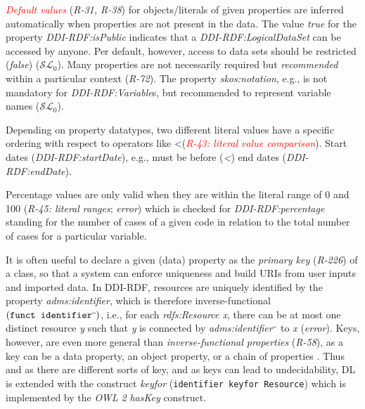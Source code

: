 \documentclass[conference]{IEEEtran}
\newcommand{\ms}[1]{\texttt{#1}}
\newenvironment{DL}{
  \small
  \vspace{0cm}
	\begin{center}
  \begin{tabular}{c l}

}{
  \end{tabular}
	\end{center}
}
\begin{document}
\textcolor{red}{\emph{Default values}} (\emph{R-31, R-38}) for objects/literals of given properties are inferred automatically when properties are not present in the data.
The value \emph{true} for the property {\em DDI-RDF:isPublic} indicates that a {\em DDI-RDF:LogicalDataSet} can be accessed by anyone.
Per default, however, access to data sets should be restricted (\emph{false}) ($\mathcal{SL}_{0}$).
Many properties are not necessarily required but \emph{recommended} within a particular context (\emph{R-72}).
The property {\em skos:notation}, e.g., is not mandatory for {\em DDI-RDF:Variable}s, but recommended to represent variable names ($\mathcal{SL}_{0}$).

Depending on property datatypes, two different literal values have
a specific ordering with respect to operators like \textless  (\textcolor{red}{\emph{R-43: literal value comparison}}).
Start dates (\emph{DDI-RDF:startDate}), e.g., must be before (\emph{\textless}) end dates (\emph{DDI-RDF:endDate}).

Percentage values are only valid when they are within the literal range of 0 and 100 (\emph{R-45: literal ranges}; \emph{error})
which is checked for \emph{DDI-RDF:percentage} standing for the number of cases of a given code in relation to the total number of cases for a particular variable.


It is often useful to declare a given (data) property as the \emph{primary key} (\emph{R-226}) of a class, so that a system can enforce uniqueness and build URIs from user inputs and imported data. 
In DDI-RDF, resources are uniquely identified by the property \emph{adms:identifier},
which is therefore inverse-functional $({\small\ms{funct identifier}\sp{\overline{\ }}})$,
i.e., for each \emph{rdfs:Resource x}, there can be at most one distinct resource \emph{y} such that \emph{y} is connected by \emph{adms:identifier$\sp{\overline{\ }}$} to \emph{x} (\emph{error}).
Keys, however, are even more general than \emph{inverse-functional properties} (\emph{R-58}),
as a key can be a data property, an object property, or a chain of properties \cite{Schneider2009}.
Thus and as there are different sorts of key, and as keys can lead to undecidability, 
DL is extended with the construct \emph{keyfor} ({\small\ms{identifier \ms{keyfor} Resource}}) \cite{Lutz2005} which is implemented by the \emph{OWL 2} \emph{hasKey} construct.
\end{document}
